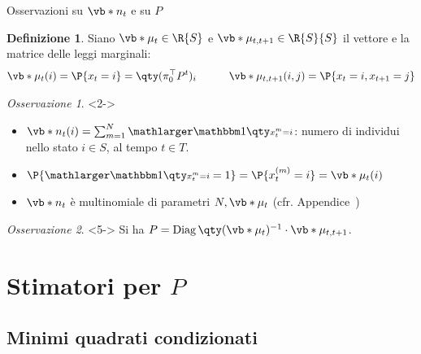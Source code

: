 \documentclass[10pt,xcolor={table,dvipsnames}]{beamer} 		%
\theoremstyle{plain}					%
\theoremstyle{definition}
\newtheorem*{definizione*}{Definizione}	%
\theoremstyle{remark}
\newtheorem*{oss*}{Osservazione}
\newcommand{\transpose}[1]{#1^{\top}}
\begin{document}
	\begin{frame}
		{\hypertarget{frame:dettagli_nt}{Osservazioni su $\vb*{n}_t$ e su $P$}}
		\begin{definizione*}
			Siano $\vb*{\mu}_t\in\R{S}$ e $\vb*{\mu}_{t,t+1}\in\R{S}{S}$ il vettore e la matrice
			delle leggi marginali:
			\vspace*{-0.5\baselineskip}
			\[\begin{aligned}
				\vb*{\mu}_t(i)=\P{x_t=i}=\qty(\transpose{\pi_0}P^t)_i & \qquad & \vb*{\mu}_{t,t+1}(i,j)=\P{x_t=i,x_{t+1}=j}\\
			\end{aligned}\]
		\end{definizione*}

		\begin{oss*}<2->
			\begin{itemize}
				\item<2-> $\vb*{n}_t(i)=\sum_{m=1}^N\indicator$: numero di individui nello stato $i\in S$,
				al tempo $t\in T$.
				\item<3-> $\P{\indicator =1}=\P{x_t^{(m)}=i}=\vb*{\mu}_t(i)$
				\item<4-> $\vb*{n}_t$ è multinomiale di parametri $N,\vb*{\mu}_t$
				(cfr. Appendice~\hyperlink{frame:dettagli_nt:appendice}{\faHandPointRight})
			\end{itemize}
		\end{oss*}

		\begin{oss*}<5->
			Si ha $P=\operatorname{Diag}\qty(\vb*{\mu}_t)^{-1}\cdot\vb*{\mu}_{t,t+1}$.

		\end{oss*}

	\end{frame}



\section{Stimatori per \texorpdfstring{$P$}{P}}
	\subsection{Minimi quadrati condizionati}
\end{document}
